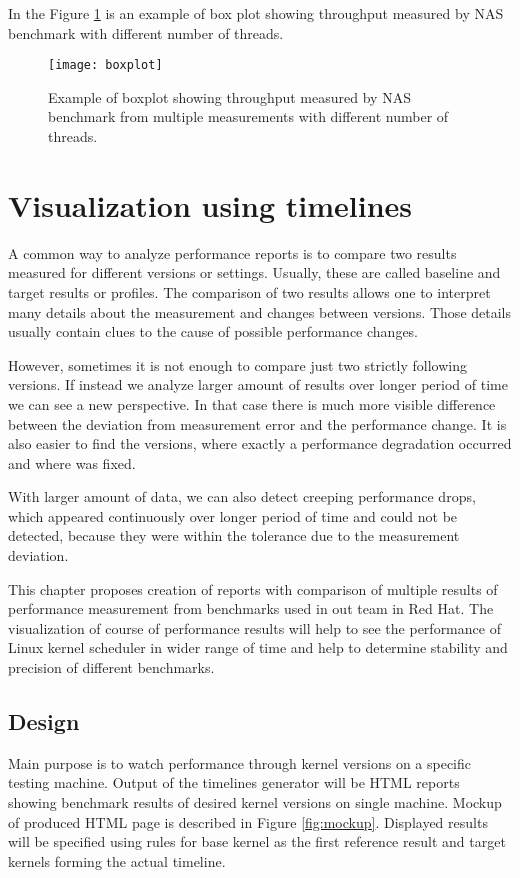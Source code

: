 In the Figure \ref{fig:boxplot} is an example of box plot showing throughput
measured by NAS benchmark with different number of threads.  

\begin{figure}
  \centering
  \texttt{[image: boxplot]}
  \caption{Example of boxplot showing throughput measured by NAS benchmark from
    multiple measurements with different number of threads.}
  \label{fig:boxplot}
\end{figure}



\chapter{Visualization using timelines} \label{ch:timelines}
A common way to analyze performance reports is to compare two results measured
for different versions or settings. Usually, these
are called baseline and target results or profiles. The comparison of two
results allows one to
interpret many details about the measurement and changes between versions. Those
details usually contain clues to the cause of possible performance changes.

However, sometimes it is not enough to compare just two strictly following
versions. If instead we analyze larger amount
of results over longer period of time we can see a new perspective. In that case
there is much
more visible difference between the deviation from measurement error and the
performance change. It is also easier to find the versions, where exactly a
performance degradation occurred and where was fixed.

With larger amount of data, we can also detect creeping performance drops, which
appeared continuously over longer period of time and could not be detected,
because they were within the tolerance due to the measurement deviation.

This chapter proposes creation of reports with comparison of multiple results of
performance measurement from benchmarks used in out team in Red Hat. The
visualization of course of performance results will help to see the performance
of Linux kernel scheduler in wider range of time and help to determine stability
and precision of different benchmarks.

\section{Design}
Main purpose is to watch performance through kernel versions on a specific testing
machine. Output of the timelines generator will be HTML reports showing
benchmark results of desired kernel versions on single machine. Mockup of
produced HTML page is described in Figure \ref{fig:mockup}. Displayed results
will be specified using rules for base kernel as the first reference result
and target kernels forming the actual timeline.

